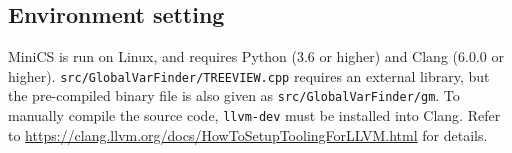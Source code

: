 \subsection{Environment setting}

MiniCS is run on Linux, and requires Python (3.6 or higher) and Clang (6.0.0 or higher). \verb|src/GlobalVarFinder/TREEVIEW.cpp| requires an external library, but the pre-compiled binary file is also given as \verb|src/GlobalVarFinder/gm|. To manually compile the source code, \verb|llvm-dev| must be installed into Clang. Refer to \url{https://clang.llvm.org/docs/HowToSetupToolingForLLVM.html} for details.